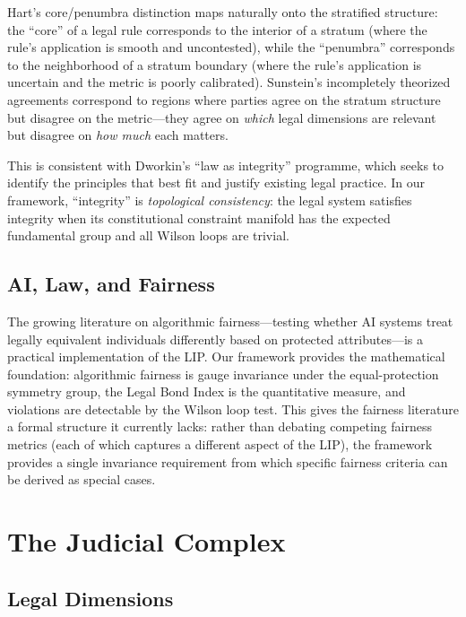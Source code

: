 \documentclass[12pt]{article}
\theoremstyle{definition}
\theoremstyle{remark}
\begin{document}
Hart's core/penumbra distinction maps naturally onto the stratified structure: the ``core'' of a legal rule corresponds to the interior of a stratum (where the rule's application is smooth and uncontested), while the ``penumbra'' corresponds to the neighborhood of a stratum boundary (where the rule's application is uncertain and the metric is poorly calibrated).  Sunstein's incompletely theorized agreements correspond to regions where parties agree on the stratum structure but disagree on the metric---they agree on \emph{which} legal dimensions are relevant but disagree on \emph{how much} each matters.

This is consistent with Dworkin's \cite{dworkin1986} ``law as integrity'' programme, which seeks to identify the principles that best fit and justify existing legal practice.  In our framework, ``integrity'' is \emph{topological consistency}: the legal system satisfies integrity when its constitutional constraint manifold has the expected fundamental group and all Wilson loops are trivial.

\subsection{AI, Law, and Fairness}

The growing literature on algorithmic fairness---testing whether AI systems treat legally equivalent individuals differently based on protected attributes---is a practical implementation of the LIP.  Our framework provides the mathematical foundation: algorithmic fairness is gauge invariance under the equal-protection symmetry group, the Legal Bond Index is the quantitative measure, and violations are detectable by the Wilson loop test.  This gives the fairness literature a formal structure it currently lacks: rather than debating competing fairness metrics (each of which captures a different aspect of the LIP), the framework provides a single invariance requirement from which specific fairness criteria can be derived as special cases.


\section{The Judicial Complex}
\label{sec:manifold}

\subsection{Legal Dimensions}
\end{document}
